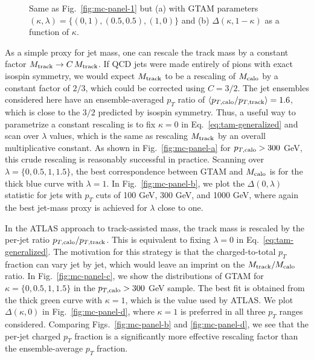 \documentclass[letterpaper,11pt]{article}
\newcommand{\Fig}[1]{Fig.~\ref{#1}}
\newcommand{\Figs}[2]{Figs.~\ref{#1} and \ref{#2}}
\newcommand{\Eq}[1]{Eq.~\eqref{#1}}
\begin{document}
\begin{figure}
	\centering
	\caption{Same as \Fig{fig:mc-panel-1} but (a) with GTAM parameters $(\kappa,\lambda) = \{(0,1),(0.5,0.5),(1,0) \}$ and (b) $\Delta(\kappa,1-\kappa)$ as a function of $\kappa$. }
	\label{fig:mc-panel-3}
\end{figure}

As a simple proxy for jet mass, one can rescale the track mass by a constant factor $M_{\rm track} \rightarrow C\, M_{\rm track}$. 
%
If QCD jets were made entirely of pions with exact isospin symmetry, we would expect $M_{\rm track}$ to be a rescaling of $M_{\rm calo}$ by a constant factor of $2/3$, which could be corrected using $C = 3/2$.
%
The jet ensembles considered here have an ensemble-averaged $p_T$ ratio of $\langle p_{T,\rm calo}/p_{T,\rm track}\rangle = 1.6$, which is close to the $3/2$ predicted by isospin symmetry.
%
Thus, a useful way to parametrize a constant rescaling is to fix $\kappa = 0$ in \Eq{eq:tam-generalized} and scan over $\lambda$ values, which is the same as rescaling $M_{\rm track}$ by an overall multiplicative constant.
%
As shown in \Fig{fig:mc-panel-a} for $p_{T,\rm calo} > 300$ GeV, this crude rescaling is reasonably successful in practice.
%
Scanning over $\lambda = \{0,0.5,1,1.5\}$, the best correspondence between GTAM and $M_{\rm calo}$ is for the thick blue curve with $\lambda = 1$.
%
In \Fig{fig:mc-panel-b}, we plot the $\Delta(0,\lambda)$ statistic for jets with $p_T$ cuts of 100 GeV, 300 GeV, and 1000 GeV, where again the best jet-mass proxy is achieved for $\lambda$ close to one.

In the ATLAS approach to track-assisted mass, the track mass is rescaled by the per-jet ratio $p_{T,\rm calo}/p_{T,\rm track}$.
%
This is equivalent to fixing $\lambda = 0$ in \Eq{eq:tam-generalized}.
%
The motivation for this strategy is that the charged-to-total $p_T$ fraction can vary jet by jet, which would leave an imprint on the $M_{\rm track}/M_{\rm calo}$ ratio. 
%
In \Fig{fig:mc-panel-c}, we show the distributions of GTAM for $\kappa = \{0,0.5,1,1.5\}$ in the $p_{T,\rm calo} > 300$ GeV sample.
%
The best fit is obtained from the thick green curve with $\kappa = 1$, which is the value used by ATLAS.
%
We plot $\Delta(\kappa,0)$ in \Fig{fig:mc-panel-d}, where $\kappa = 1$ is preferred in all three $p_T$ ranges considered.
%
Comparing \Figs{fig:mc-panel-b}{fig:mc-panel-d}, we see that the per-jet charged $p_T$ fraction is a significantly more effective rescaling factor than the ensemble-average $p_T$ fraction. 
\end{document}
